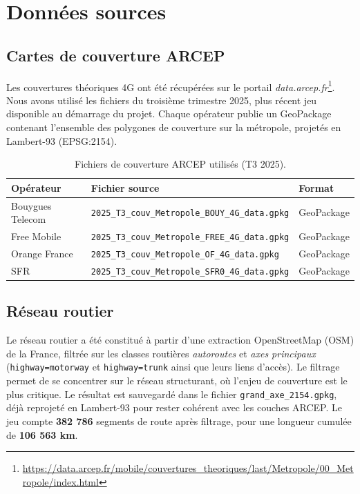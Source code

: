 \documentclass[11pt,a4paper]{article}
\begin{document}
\section{Données sources}

\subsection{Cartes de couverture ARCEP}

Les couvertures théoriques 4G ont été récupérées sur le portail \emph{data.arcep.fr}\footnote{\url{https://data.arcep.fr/mobile/couvertures_theoriques/last/Metropole/00_Metropole/index.html}}. Nous avons utilisé les fichiers du troisième trimestre 2025, plus récent jeu disponible au démarrage du projet. Chaque opérateur publie un GeoPackage contenant l'ensemble des polygones de couverture sur la métropole, projetés en Lambert-93 (EPSG:2154).

\begin{table}[H]
  \centering
  \caption{Fichiers de couverture ARCEP utilisés (T3 2025).}
  \begin{tabular}{lll}
    \toprule
    \textbf{Opérateur} & \textbf{Fichier source} & \textbf{Format} \\
    \midrule
    Bouygues Telecom & \texttt{2025\_T3\_couv\_Metropole\_BOUY\_4G\_data.gpkg} & GeoPackage \\
    Free Mobile      & \texttt{2025\_T3\_couv\_Metropole\_FREE\_4G\_data.gpkg} & GeoPackage \\
    Orange France    & \texttt{2025\_T3\_couv\_Metropole\_OF\_4G\_data.gpkg}   & GeoPackage \\
    SFR              & \texttt{2025\_T3\_couv\_Metropole\_SFR0\_4G\_data.gpkg} & GeoPackage \\
    \bottomrule
  \end{tabular}
\end{table}

\subsection{Réseau routier}

Le réseau routier a été constitué à partir d'une extraction OpenStreetMap (OSM) de la France, filtrée sur les classes routières \emph{autoroutes} et \emph{axes principaux} (\texttt{highway=motorway} et \texttt{highway=trunk} ainsi que leurs liens d'accès). Le filtrage permet de se concentrer sur le réseau structurant, où l'enjeu de couverture est le plus critique. Le résultat est sauvegardé dans le fichier \texttt{grand\_axe\_2154.gpkg}, déjà reprojeté en Lambert-93 pour rester cohérent avec les couches ARCEP. Le jeu compte \textbf{382 786} segments de route après filtrage, pour une longueur cumulée de \textbf{106 563 km}.
\end{document}
